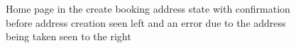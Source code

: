 \begin{figure}
    \centering
    \hfill
    \caption[Home page -- Creation of booking address: confirmation and error]{Home page in the create booking address state with confirmation before address creation seen left and an error due to the address being taken seen to the right}
    \label{fig:home_page_create_address_2}
\end{figure}

